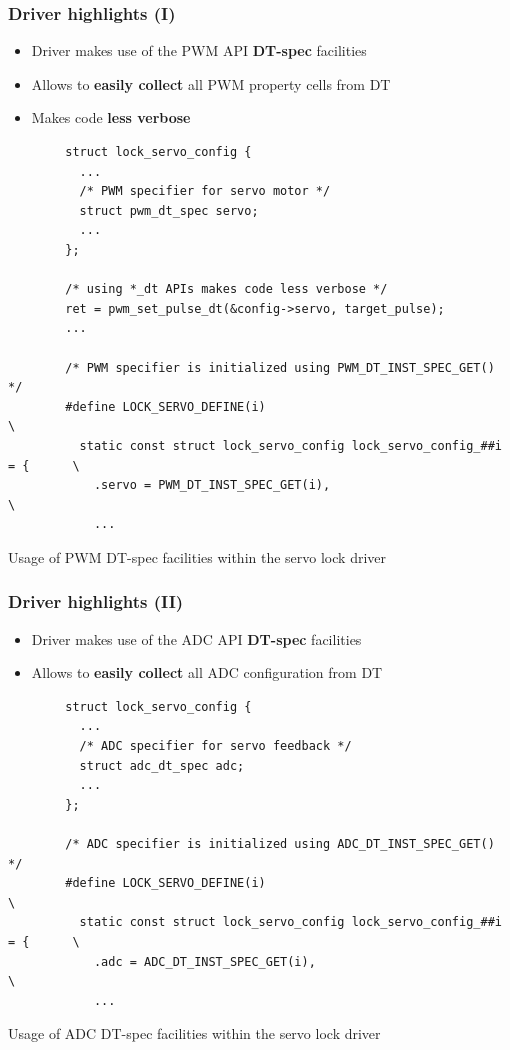 \documentclass[handout]{beamer}
\begin{document}
\begin{frame}[fragile]
  \frametitle{Driver highlights (I)}

  \begin{itemize}
    \item Driver makes use of the PWM API \textbf{DT-spec} facilities
    \item Allows to \textbf{easily collect} all PWM property cells from DT
    \item Makes code \textbf{less verbose}
  \end{itemize}

  \begin{listing}[H]
    \begin{verbatim}
        struct lock_servo_config {
          ...
          /* PWM specifier for servo motor */
          struct pwm_dt_spec servo;
          ...
        };

        /* using *_dt APIs makes code less verbose */
        ret = pwm_set_pulse_dt(&config->servo, target_pulse);
        ...

        /* PWM specifier is initialized using PWM_DT_INST_SPEC_GET() */
        #define LOCK_SERVO_DEFINE(i)                                           \
          static const struct lock_servo_config lock_servo_config_##i = {      \
            .servo = PWM_DT_INST_SPEC_GET(i),                                  \
            ...
    \end{verbatim}
    \caption{Usage of PWM DT-spec facilities within the servo lock driver}
  \end{listing}
\end{frame}

\begin{frame}[fragile]
  \frametitle{Driver highlights (II)}

  \begin{itemize}
    \item Driver makes use of the ADC API \textbf{DT-spec} facilities
    \item Allows to \textbf{easily collect} all ADC configuration from DT
  \end{itemize}

  \begin{listing}[H]
    \begin{verbatim}
        struct lock_servo_config {
          ...
          /* ADC specifier for servo feedback */
          struct adc_dt_spec adc;
          ...
        };

        /* ADC specifier is initialized using ADC_DT_INST_SPEC_GET() */
        #define LOCK_SERVO_DEFINE(i)                                           \
          static const struct lock_servo_config lock_servo_config_##i = {      \
            .adc = ADC_DT_INST_SPEC_GET(i),                                    \
            ...
    \end{verbatim}
    \caption{Usage of ADC DT-spec facilities within the servo lock driver}
  \end{listing}
\end{frame}
\end{document}
